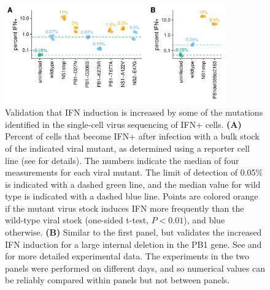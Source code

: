 \documentclass[9pt,lineno]{elife}
\begin{document}
\begin{figure}

\centerline{\includegraphics[width=0.85\textwidth]{figures/Validation_Figure/ifn_plot.pdf}}
\caption{Validation that IFN induction is increased by some of the mutations identified in the single-cell virus sequencing of IFN+ cells.
{\bf (A)}
Percent of cells that become IFN+ after infection with a bulk stock of the indicated viral mutant, as determined using a reporter cell line (see  for details).
The numbers indicate the median of four measurements for each viral mutant.
The limit of detection of 0.05\% is indicated with a dashed green line, and the median value for wild type is indicated with a dashed blue line.
Points are colored orange if the mutant virus stock induces IFN more frequently than the wild-type viral stock (one-sided t-test, $P < 0.01$), and blue otherwise.
{\bf (B)}
Similar to the first panel, but validates the increased IFN induction for a large internal deletion in the PB1 gene.
See  and  for more detailed experimental data.
The experiments in the two panels were performed on different days, and so numerical values can be reliably compared within panels but not between panels.
}
\label{fig:validation}


\end{figure}
\end{document}
